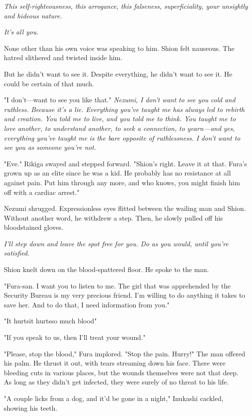 \emph{This self-righteousness, this arrogance, this falseness, superficiality,
your unsightly and hideous nature.}

\emph{It's all you.}

None other than his own voice was speaking to him. Shion felt nauseous.
The hatred slithered and twisted inside him.

But he didn't want to see it. Despite everything, he didn't want to see
it. He could be certain of that much.

"I don't---want to see you like that." \emph{Nezumi, I don't want to see you
cold and ruthless. Because it's a lie. Everything you've taught me has
always led to rebirth and creation. You told me to live, and you told me
to think. You taught me to love another, to understand another, to seek
a connection, to yearn---and yes, everything you've taught me is the bare
opposite of ruthlessness. I don't want to see you as someone you're not.}

"Eve." Rikiga swayed and stepped forward. "Shion's right. Leave it at
that. Fura's grown up as an elite since he was a kid. He probably has no
resistance at all against pain. Put him through any more, and who knows,
you might finish him off with a cardiac arrest."

Nezumi shrugged. Expressionless eyes flitted between the wailing man and
Shion. Without another word, he withdrew a step. Then, he slowly pulled
off his bloodstained gloves.

\emph{I'll step down and leave the spot free for you. Do as you would, until
you're satisfied.}

Shion knelt down on the blood-spattered floor. He spoke to the man.

"Fura-san. I want you to listen to me. The girl that was apprehended by
the Security Bureau is my very precious friend. I'm willing to do
anything it takes to save her. And to do that, I need information from
you."

"It hurts\el it hurts\el so much blood\el "

"If you speak to us, then I'll treat your wound."

"Please, stop the blood," Fura implored. "Stop the pain. Hurry!" The man
offered his palm. He thrust it out, with tears streaming down his face.
There were bleeding cuts in various places, but the wounds themselves
were not that deep. As long as they didn't get infected, they were
surely of no threat to his life.

"A couple licks from a dog, and it'd be gone in a night," Inukashi
cackled, showing his teeth.

